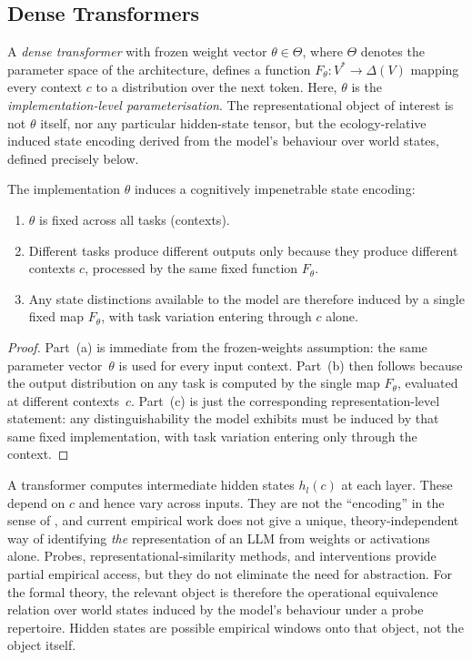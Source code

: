\documentclass[twoside,11pt]{article}
\begin{document}
\subsection{Dense Transformers}

\begin{definition}\label{def:dense-encoding}
A \emph{dense transformer} with frozen weight vector $\theta \in \Theta$, where $\Theta$ denotes the parameter space of the architecture, defines a function $F_\theta \colon V^* \to \Delta(V)$ mapping every context $c$ to a distribution over the next token. Here, $\theta$ is the \emph{implementation-level parameterisation}. The representational object of interest is not $\theta$ itself, nor any particular hidden-state tensor, but the ecology-relative induced state encoding derived from the model's behaviour over world states, defined precisely below.
\end{definition}

\begin{proposition}\label{prop:dense-impen}
The implementation $\theta$ induces a cognitively impenetrable state encoding:
\begin{enumerate}[label=(\alph*)]
\item $\theta$ is fixed across all tasks (contexts).
\item Different tasks produce different outputs only because they produce different contexts $c$, processed by the same fixed function $F_\theta$.
\item Any state distinctions available to the model are therefore induced by a single fixed map $F_\theta$, with task variation entering through $c$ alone.
\end{enumerate}
\end{proposition}

\begin{proof}
Part~(a) is immediate from the frozen-weights assumption: the same parameter vector~$\theta$ is used for every input context. Part~(b) then follows because the output distribution on any task is computed by the single map $F_\theta$, evaluated at different contexts~$c$. Part~(c) is just the corresponding representation-level statement: any distinguishability the model exhibits must be induced by that same fixed implementation, with task variation entering only through the context.
\end{proof}

A transformer computes intermediate hidden states $h_l(c)$ at each layer. These depend on $c$ and hence vary across inputs. They are not the ``encoding'' in the sense of \citet{dallariva_2026}, and current empirical work does not give a unique, theory-independent way of identifying \emph{the} representation of an LLM from weights or activations alone. Probes, representational-similarity methods, and interventions provide partial empirical access, but they do not eliminate the need for abstraction. For the formal theory, the relevant object is therefore the operational equivalence relation over world states induced by the model's behaviour under a probe repertoire. Hidden states are possible empirical windows onto that object, not the object itself.
\end{document}
